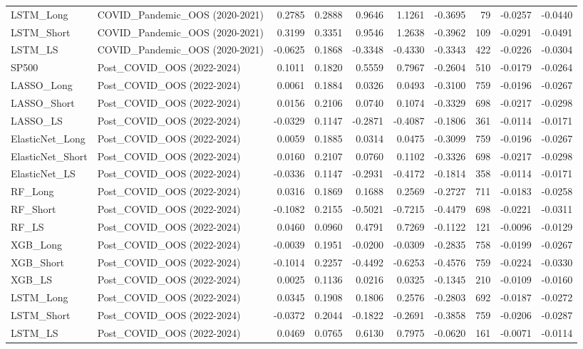 \begin{tabular}{llrrrrrrrr}
\cline{1-10}
LSTM\_Long & COVID\_Pandemic\_OOS (2020-2021) & 0.2785 & 0.2888 & 0.9646 & 1.1261 & -0.3695 & 79 & -0.0257 & -0.0440 \\
\cline{1-10}
LSTM\_Short & COVID\_Pandemic\_OOS (2020-2021) & 0.3199 & 0.3351 & 0.9546 & 1.2638 & -0.3962 & 109 & -0.0291 & -0.0491 \\
\cline{1-10}
LSTM\_LS & COVID\_Pandemic\_OOS (2020-2021) & -0.0625 & 0.1868 & -0.3348 & -0.4330 & -0.3343 & 422 & -0.0226 & -0.0304 \\
\cline{1-10}
SP500 & Post\_COVID\_OOS (2022-2024) & 0.1011 & 0.1820 & 0.5559 & 0.7967 & -0.2604 & 510 & -0.0179 & -0.0264 \\
\cline{1-10}
LASSO\_Long & Post\_COVID\_OOS (2022-2024) & 0.0061 & 0.1884 & 0.0326 & 0.0493 & -0.3100 & 759 & -0.0196 & -0.0267 \\
\cline{1-10}
LASSO\_Short & Post\_COVID\_OOS (2022-2024) & 0.0156 & 0.2106 & 0.0740 & 0.1074 & -0.3329 & 698 & -0.0217 & -0.0298 \\
\cline{1-10}
LASSO\_LS & Post\_COVID\_OOS (2022-2024) & -0.0329 & 0.1147 & -0.2871 & -0.4087 & -0.1806 & 361 & -0.0114 & -0.0171 \\
\cline{1-10}
ElasticNet\_Long & Post\_COVID\_OOS (2022-2024) & 0.0059 & 0.1885 & 0.0314 & 0.0475 & -0.3099 & 759 & -0.0196 & -0.0267 \\
\cline{1-10}
ElasticNet\_Short & Post\_COVID\_OOS (2022-2024) & 0.0160 & 0.2107 & 0.0760 & 0.1102 & -0.3326 & 698 & -0.0217 & -0.0298 \\
\cline{1-10}
ElasticNet\_LS & Post\_COVID\_OOS (2022-2024) & -0.0336 & 0.1147 & -0.2931 & -0.4172 & -0.1814 & 358 & -0.0114 & -0.0171 \\
\cline{1-10}
RF\_Long & Post\_COVID\_OOS (2022-2024) & 0.0316 & 0.1869 & 0.1688 & 0.2569 & -0.2727 & 711 & -0.0183 & -0.0258 \\
\cline{1-10}
RF\_Short & Post\_COVID\_OOS (2022-2024) & -0.1082 & 0.2155 & -0.5021 & -0.7215 & -0.4479 & 698 & -0.0221 & -0.0311 \\
\cline{1-10}
RF\_LS & Post\_COVID\_OOS (2022-2024) & 0.0460 & 0.0960 & 0.4791 & 0.7269 & -0.1122 & 121 & -0.0096 & -0.0129 \\
\cline{1-10}
XGB\_Long & Post\_COVID\_OOS (2022-2024) & -0.0039 & 0.1951 & -0.0200 & -0.0309 & -0.2835 & 758 & -0.0199 & -0.0267 \\
\cline{1-10}
XGB\_Short & Post\_COVID\_OOS (2022-2024) & -0.1014 & 0.2257 & -0.4492 & -0.6253 & -0.4576 & 759 & -0.0224 & -0.0330 \\
\cline{1-10}
XGB\_LS & Post\_COVID\_OOS (2022-2024) & 0.0025 & 0.1136 & 0.0216 & 0.0325 & -0.1345 & 210 & -0.0109 & -0.0160 \\
\cline{1-10}
LSTM\_Long & Post\_COVID\_OOS (2022-2024) & 0.0345 & 0.1908 & 0.1806 & 0.2576 & -0.2803 & 692 & -0.0187 & -0.0272 \\
\cline{1-10}
LSTM\_Short & Post\_COVID\_OOS (2022-2024) & -0.0372 & 0.2044 & -0.1822 & -0.2691 & -0.3858 & 759 & -0.0206 & -0.0287 \\
\cline{1-10}
LSTM\_LS & Post\_COVID\_OOS (2022-2024) & 0.0469 & 0.0765 & 0.6130 & 0.7975 & -0.0620 & 161 & -0.0071 & -0.0114 \\
\cline{1-10}
\bottomrule
\end{tabular}
